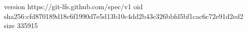 version https://git-lfs.github.com/spec/v1
oid sha256:cfd870189d18c6f1990d7e5d13b10c4dd2b43c326bbfd5bf1cac6c72e91d2ed2
size 335915
